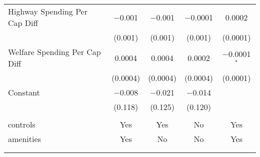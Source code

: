 \begin{table}[!htbp]
\begin{tabular}{@{\extracolsep{5pt}}lcccc}
  Highway Spending Per Cap Diff & $-$0.001 & $-$0.001 & $-$0.0001 & 0.0002 \\ 
  & (0.001) & (0.001) & (0.001) & (0.0001) \\ 
  Welfare Spending Per Cap Diff & 0.0004 & 0.0004 & 0.0002 & $-$0.0001$^{*}$ \\ 
  & (0.0004) & (0.0004) & (0.0004) & (0.0001) \\ 
  Constant & $-$0.008 & $-$0.021 & $-$0.014 &  \\ 
  & (0.118) & (0.125) & (0.120) &  \\ 
 \hline \\[-1.8ex] 
controls & Yes & Yes & No & Yes \\ 
amenities & Yes & No & No & Yes \\ 
\hline \\[-1.8ex] 
\hline 
\hline \\[-1.8ex] 
\end{tabular} 
\end{table} 
